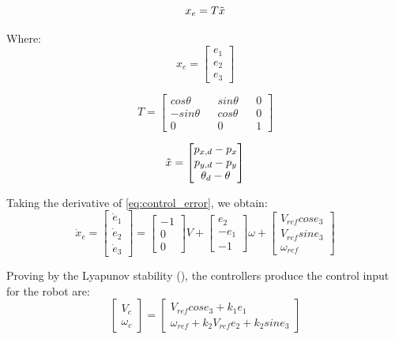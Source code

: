 \begin{equation} \label{eq:control_error}
x_e = T \Tilde{x}
\end{equation}

Where:
\begin{equation}
x_e =
\begin{bmatrix}
e_1\\
e_2\\
e_3
\end{bmatrix}
\end{equation}

\begin{equation}
T = \begin{bmatrix}
cos\theta && sin\theta && 0\\
-sin\theta && cos\theta && 0\\
0 && 0 && 1
\end{bmatrix}
\end{equation}

\begin{equation}
\Tilde{x} = \begin{bmatrix}
p_{x,d} - p_x\\
p_{y,d} - p_y\\
\theta_d - \theta
\end{bmatrix}
\end{equation}

Taking the derivative of \ref{eq:control_error}, we obtain:
\begin{equation}
\Dot{x}_e=
\begin{bmatrix}
\Dot{e}_1\\
\Dot{e}_2\\
\Dot{e}_3
\end{bmatrix}=
\begin{bmatrix}
-1\\
0\\
0
\end{bmatrix}V+
\begin{bmatrix}
e_2\\
-e_1\\
-1
\end{bmatrix}\omega+
\begin{bmatrix}
V_{ref} cos e_3\\
V_{ref} sin e_3\\
\omega_{ref}
\end{bmatrix}
\end{equation}

Proving by the Lyapunov stability (\cite{zidani2015backstepping}), the controllers produce the control input for the robot are:
\begin{equation}
\begin{bmatrix}
V_c\\
\omega_c
\end{bmatrix} = 
\begin{bmatrix}
V_{ref} cos e_3 + k_1e_1\\
\omega_{ref} + k_2 V_{ref} e_2 + k_2 sin e_3
\end{bmatrix}
\end{equation}

